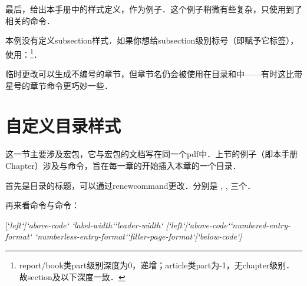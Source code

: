 最后，给出本手册中的样式定义，作为例子．这个例子稍微有些复杂，只使用到了相关的命令．

本例没有定义subsection样式．如果你想给subsection级别标号（即赋予它标签），使用：\footnote{report/book类part级别深度为0，递增；article类part为-1，无chapter级别．故section及以下深度一致．}．

临时更改可以生成不编号的章节，但章节名仍会被使用在目录和中——有时这比带星号的章节命令更巧妙一些．

\section{自定义目录样式}
\label{sec:titletoc}
这一节主要涉及宏包，它与宏包的文档写在同一个pdf中．上节的例子（即本手册Chapter）涉及与命令，旨在每一章的开始插入本章的一个目录．

首先是目录的标题，可以通过renewcommand更改．分别是 , , 三个．

再来看命令与命令：
\begin{latex}
[`\itshape left`]{`\itshape above-code`}
    {`\itshape label-width`}{`\itshape leader-width`}
[`\itshape left`]{`\itshape above-code`}{`\itshape numbered-entry-format`}
    {`\itshape numberless-entry-format`}{`\itshape filler-page-format`}[`\itshape below-code`]
\end{latex}

